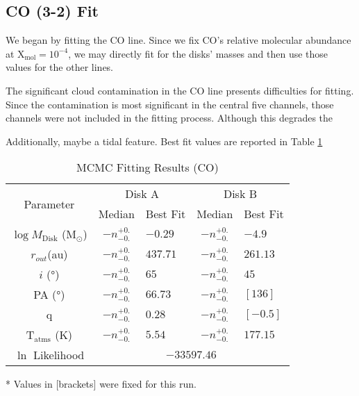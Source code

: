 \subsection{CO (3-2) Fit}
We began by fitting the CO line. Since we fix CO's relative molecular abundance at X$_\text{mol}=10^{-4}$, we may directly fit for the disks' masses and then use those values for the other lines.

The significant cloud contamination in the CO line presents difficulties for fitting. Since the contamination is most significant in the central five channels, those channels were not included in the fitting process. Although this degrades the

Additionally, maybe a tidal feature. Best fit values are reported in Table \ref{table:fit_co}



\begin{table}
  \begin{threeparttable}
    \centering
    \caption{MCMC Fitting Results (CO)}
    \label{table:fit_co}
    \renewcommand{\arraystretch}{1.2}
    \begin{tabular}{c c l c l }
      \toprule \toprule
      \multirow{2}{*}{Parameter} & \multicolumn{2}{c}{Disk A} & \multicolumn{2}{c}{Disk B} \\
                                 & Median & Best Fit          & Median & Best Fit \\
      \midrule %
      $\log M_\text{Disk}$ (M$_\odot$) & $ -n _{-0.} ^{+0.}$ & $-0.29$    & $ -n _{-0.} ^{+0.}$ & $-4.9$ \\
      $r_{out}$(\si{au})               & $ -n _{-0.} ^{+0.}$ & $437.71$    & $ -n _{-0.} ^{+0.}$  & $261.13$    \\
      $i$ (\si{\degree})               & $ -n _{-0.} ^{+0.}$ & $65$    & $ -n _{-0.} ^{+0.}$ & $45$    \\
      PA  (\si{\degree})               & $ -n _{-0.} ^{+0.}$ & $66.73$  & $ -n _{-0.} ^{+0.}$  & $[136]$  \\
      q                                & $ -n _{-0.} ^{+0.}$ & $0.28$  & $ -n _{-0.} ^{+0.}$  & $[-0.5]$  \\
      T$_\text{atms}$ (K)              & $ -n _{-0.} ^{+0.}$ & $5.54 $  & $ -n _{-0.} ^{+0.}$  & $177.15$  \\
      $\ln$ Likelihood          & \multicolumn{4}{c}{$-33597.46$} \\
      \bottomrule
    \end{tabular}

    \begin{tablenotes}\footnotesize
      \item[*] Values in [brackets] were fixed for this run.
    \end{tablenotes}
  \end{threeparttable}
\end{table}




